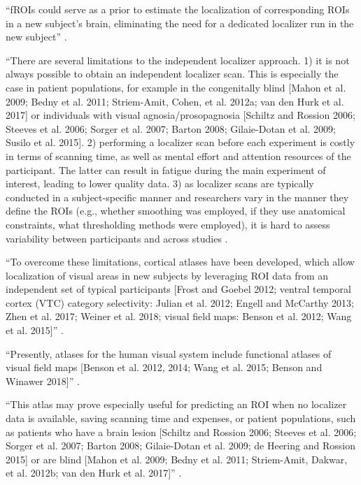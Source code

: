
``fROIs could serve as a prior to estimate the localization of corresponding
ROIs in a new subject's brain, eliminating the need for a dedicated localizer
run in the new subject'' \citep{rosenke2021probabilistic}.

``There are several limitations to the independent localizer approach.
%
1) it is not always possible to obtain an independent localizer scan.
%
This is especially the case in patient populations, for example in the
congenitally blind [Mahon et al. 2009; Bedny et al. 2011; Striem-Amit, Cohen, et
al. 2012a; van den Hurk et al. 2017] or individuals with visual
agnosia/prosopagnosia [Schiltz and Rossion 2006; Steeves et al. 2006; Sorger et
al.  2007; Barton 2008; Gilaie-Dotan et al. 2009; Susilo et al. 2015].
%
2) performing a localizer scan before each experiment is costly in terms of
scanning time, as well as mental effort and attention resources of the
participant.
%
The latter can result in fatigue during the main experiment of interest, leading
to lower quality data.
%
3) as localizer scans are typically conducted in a subject-specific manner and
researchers vary in the manner they define the ROIs (e.g., whether smoothing was
employed, if they use anatomical constraints, what thresholding methods were
employed), it is hard to assess variability between participants and across
studies \citep{rosenke2021probabilistic}.

``To overcome these limitations, cortical atlases have been developed, which
allow localization of visual areas in new subjects by leveraging ROI data from
an independent set of typical participants [Frost and Goebel 2012; ventral
temporal cortex (VTC) category selectivity: Julian et al. 2012; Engell and
McCarthy 2013; Zhen et al.  2017; Weiner et al. 2018; visual field maps: Benson
et al. 2012; Wang et al. 2015]'' \citep{rosenke2021probabilistic}.

``Presently, atlases for the human visual system include functional atlases of
visual field maps [Benson et al. 2012, 2014; Wang et al. 2015; Benson and
Winawer 2018]'' \citep{rosenke2021probabilistic}.

``This atlas may prove especially useful for predicting an ROI when no localizer
data is available, saving scanning time and expenses, or
%
patient populations, such as patients who have a brain lesion [Schiltz and
Rossion 2006; Steeves et al. 2006; Sorger et al. 2007; Barton 2008; Gilaie-Dotan
et al. 2009; de Heering and Rossion 2015] or are blind [Mahon et al. 2009; Bedny
et al. 2011; Striem-Amit, Dakwar, et al.  2012b; van den Hurk et al. 2017]''
\citep{rosenke2021probabilistic}.



